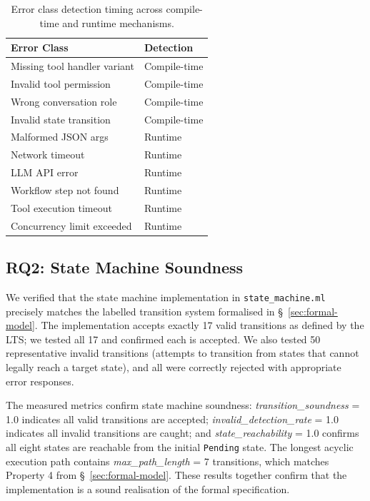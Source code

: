 \begin{table}[t]
\caption{Error class detection timing across compile-time and runtime mechanisms.}
\label{tab:error-detection}
\centering
\small
\begin{tabular}{ll}
\toprule
Error Class & Detection \\
\midrule
Missing tool handler variant & Compile-time \\
Invalid tool permission & Compile-time \\
Wrong conversation role & Compile-time \\
Invalid state transition & Compile-time \\
Malformed JSON args & Runtime \\
Network timeout & Runtime \\
LLM API error & Runtime \\
Workflow step not found & Runtime \\
Tool execution timeout & Runtime \\
Concurrency limit exceeded & Runtime \\
\bottomrule
\end{tabular}
\end{table}

\subsection{RQ2: State Machine Soundness}
\label{sec:eval:state-machine}

We verified that the state machine implementation in \texttt{state\_machine.ml} precisely matches the labelled transition system formalised in \S~\ref{sec:formal-model}. The implementation accepts exactly 17 valid transitions as defined by the LTS; we tested all 17 and confirmed each is accepted. We also tested 50 representative invalid transitions (attempts to transition from states that cannot legally reach a target state), and all were correctly rejected with appropriate error responses.

The measured metrics confirm state machine soundness: \emph{transition\_soundness} = 1.0 indicates all valid transitions are accepted; \emph{invalid\_detection\_rate} = 1.0 indicates all invalid transitions are caught; and \emph{state\_reachability} = 1.0 confirms all eight states are reachable from the initial \texttt{Pending} state. The longest acyclic execution path contains \emph{max\_path\_length} = 7 transitions, which matches Property 4 from \S~\ref{sec:formal-model}. These results together confirm that the implementation is a sound realisation of the formal specification.

